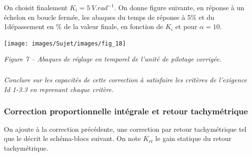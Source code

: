 \documentclass[10pt,fleqn]{article} %
\begin{document}
On choisit finalement $K_i=\SI{5}{V.rad^{-1}}$.
%
%
%
%
%
%
%
%
On donne figure suivante, en réponse à un échelon en boucle fermée, les abaques du temps de
réponse à 5\% et du 1\ier dépassement en \% de la valeur finale, en fonction de $K_i$ et pour $\alpha = 10$.


\begin{center}
\texttt{[image: images/Sujet/images/fig\_18]}

\textit{Figure 7 --  Abaques de réglage en temporel de l'unité de pilotage corrigée.}
\end{center}


\subparagraph{}
\textit{Conclure sur les capacités de cette correction à satisfaire les critères de l'exigence Id 1-3.3 en
reprenant chaque critère.}
\ifprof
\begin{corrige}
\end{corrige}
\else
\fi



\subsubsection*{Correction proportionnelle intégrale et retour tachymétrique}

On ajoute à la correction précédente, une correction par retour tachymétrique tel que le décrit le
schéma-blocs suivant. On note $K_{rt}$ le gain statique du retour tachymétrique.
\end{document}
